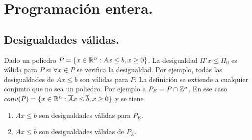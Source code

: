 \documentclass[MIOP.tex]{subfiles}
\begin{document}
\chapter{Programación entera.}

\section{Desigualdades válidas.}

Dado un poliedro $P=\{x\in\mathbb{R}^n:Ax\leq b,x\geq 0\}$. La desigualdad $\Pi'x\leq\Pi_0$ es válida para $P$ si $\forall x\in P$ se verifica la desigualdad. Por ejemplo, todas las desigualdades de $Ax\leq b$ son válidas para $P$. La definición se extiende a cualquier conjunto que no sea un poliedro. Por ejemplo a $P_E=P\cap\mathbb{Z}^n$. En ese caso $conv(P)=\{x\in\mathbb{R}^n:\overline{A}x\leq\overline{b},x\geq 0\}$ y se tiene
\begin{enumerate}
\item $Ax\leq b$ son desigualdades válidas para $P_E$.
\item $\overline{A}x\leq\overline{b}$ son desigualdades válidas de $P_E$. 
\end{enumerate} 
\end{document}

